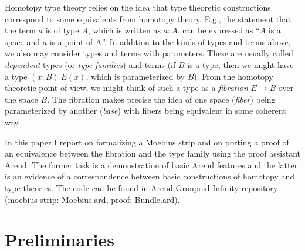 Homotopy type theory relies on the idea that type theoretic constructions correspond to some equivalents from homotopy theory. E.g., the statement that the term $a$ is of type $A$, which is written as $a:A$, can be expressed as ``$A$ is a space and $a$ is a point of A''. In addition to the kinds of types and terms above, we also may consider types and terms with parameters. These are usually called \textit{dependent} types (or \textit{type families}) and terms (if $B$ is a type, then we might have a type $(x:B)\ E(x)$, which is parameterized by $B$). From the homotopy theoretic point of view, we might think of such a type as a \textit{fibration} $E \to B$ over the space $B$. The fibration makes precise the idea of one space (\textit{fiber}) being parameterized by another (\textit{base}) with fibers being equivalent in some coherent way. %

In this paper I report on formalizing a Moebius strip and on porting a proof of an equivalence between the fibration and the type family using the proof assistant Arend. The former task is a demonstration of basic Arend features and the latter is an evidence of a correspondence between basic constructions of homotopy and type theories. The code can be found in Arend Groupoid Infinity repository (moebius strip: Moebius.ard\autocite{Moebius}, proof: Bundle.ard\autocite{Bundle}).

\section{Preliminaries}

